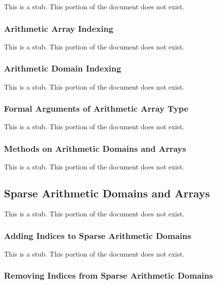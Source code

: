 This is a stub.  This portion of the document does not exist.

\subsubsection{Arithmetic Array Indexing}
\label{Arithmetic_Array_Indexing}

This is a stub.  This portion of the document does not exist.

\subsubsection{Arithmetic Domain Indexing}
\label{Arithmetic_Domain_Indexing}

This is a stub.  This portion of the document does not exist.

\subsubsection{Formal Arguments of Arithmetic Array Type}
\label{Formal_Arguments_of_Arithmetic_Array_Type}

This is a stub.  This portion of the document does not exist.

\subsubsection{Methods on Arithmetic Domains and Arrays}
\label{Methods_on_Arithmetic_Domains_and_Arrays}

This is a stub.  This portion of the document does not exist.

\subsection{Sparse Arithmetic Domains and Arrays}
\label{Sparse_Arithmetic_Domains_and_Arrays}

This is a stub.  This portion of the document does not exist.

\subsubsection{Adding Indices to Sparse Arithmetic Domains}
\label{Adding_Indices_to_Sparse_Arithmetic_Domains}

This is a stub.  This portion of the document does not exist.

\subsubsection{Removing Indices from Sparse Arithmetic Domains}
\label{Removing_Indices_from_Sparse_Arithmetic_Domains}

